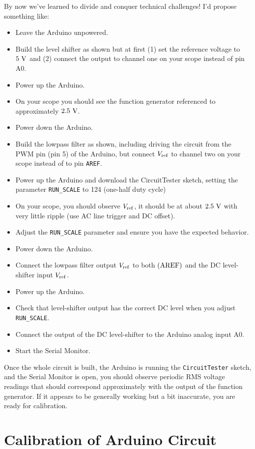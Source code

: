 \documentclass[12pt]{article}
\begin{document}
By now we've learned to divide and conquer technical challenges!  I'd propose something like:
\begin{itemize}
\item Leave the Arduino unpowered.
\item Build the level shifter as shown but at first (1) set the reference voltage to $5~\rm V$ and (2) connect the output to channel one on your scope instead of pin A0.
\item Power up the Arduino.
\item On your scope you should see the function generator referenced to approximately $2.5~\rm V$.
\item Power down the Arduino.
\item Build the lowpass filter as shown, including driving the circuit from the PWM pin (pin 5) of the Arduino, but  connect $V_{\rm ref}$ to channel two on your scope instead of to pin {\tt AREF}.
\item Power up the Arduino and download the {\rm CircuitTester} sketch, setting the parameter {\tt RUN\_SCALE} to 124 (one-half duty cycle)
\item On your scope, you should observe $V_{\rm ref}$, it should be at about $2.5~\rm V$ with very little ripple (use AC line trigger and DC offset).
\item Adjust the {\tt RUN\_SCALE} parameter and ensure you have the expected behavior.
\item Power down the Arduino.
\item Connect the lowpass filter output $V_{\rm ref}$ to both $({\rm AREF})$ and the DC level-shifter input $V_{\rm ref}$.
\item Power up the Arduino.
\item Check that level-shifter output has the correct DC level when you adjust {\tt RUN\_SCALE}.
\item Connect the output of the DC level-shifter to the Arduino analog input A0.
\item Start the Serial Monitor.
\end{itemize}

Once the whole circuit is built, the Arduino is running the {\tt CircuitTester} sketch, and the Serial Monitor is open, you should observe periodic RMS voltage readings that should correspond approximately with the output of the function generator.  If it appears to be generally working but a bit inaccurate, you are ready for calibration.

\section{Calibration of Arduino Circuit}
\end{document}
